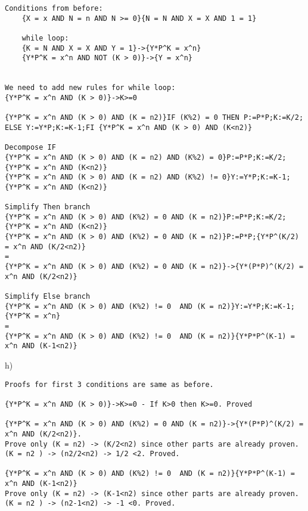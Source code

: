 \documentclass[a4paper]{article}
\begin{document}
\begin{lstlisting}	
Conditions from before:
	{X = x AND N = n AND N >= 0}{N = N AND X = X AND 1 = 1} 

	while loop:
	{K = N AND X = X AND Y = 1}->{Y*P^K = x^n} 
	{Y*P^K = x^n AND NOT (K > 0)}->{Y = x^n}
	
	
We need to add new rules for while loop:
{Y*P^K = x^n AND (K > 0)}->K>=0

{Y*P^K = x^n AND (K > 0) AND (K = n2)}IF (K%2) = 0 THEN P:=P*P;K:=K/2; ELSE Y:=Y*P;K:=K-1;FI {Y*P^K = x^n AND (K > 0) AND (K<n2)}

Decompose IF 
{Y*P^K = x^n AND (K > 0) AND (K = n2) AND (K%2) = 0}P:=P*P;K:=K/2;{Y*P^K = x^n AND (K<n2)}
{Y*P^K = x^n AND (K > 0) AND (K = n2) AND (K%2) != 0}Y:=Y*P;K:=K-1;{Y*P^K = x^n AND (K<n2)}

Simplify Then branch
{Y*P^K = x^n AND (K > 0) AND (K%2) = 0 AND (K = n2)}P:=P*P;K:=K/2;{Y*P^K = x^n AND (K<n2)}
{Y*P^K = x^n AND (K > 0) AND (K%2) = 0 AND (K = n2)}P:=P*P;{Y*P^(K/2) = x^n AND (K/2<n2)}
=
{Y*P^K = x^n AND (K > 0) AND (K%2) = 0 AND (K = n2)}->{Y*(P*P)^(K/2) = x^n AND (K/2<n2)}

Simplify Else branch
{Y*P^K = x^n AND (K > 0) AND (K%2) != 0  AND (K = n2)}Y:=Y*P;K:=K-1;{Y*P^K = x^n}
=
{Y*P^K = x^n AND (K > 0) AND (K%2) != 0  AND (K = n2)}{Y*P*P^(K-1) = x^n AND (K-1<n2)}
\end{lstlisting}

h)\\
\begin{lstlisting}	
Proofs for first 3 conditions are same as before. 

{Y*P^K = x^n AND (K > 0)}->K>=0 - If K>0 then K>=0. Proved

{Y*P^K = x^n AND (K > 0) AND (K%2) = 0 AND (K = n2)}->{Y*(P*P)^(K/2) = x^n AND (K/2<n2)}.
Prove only (K = n2) -> (K/2<n2) since other parts are already proven.
(K = n2 ) -> (n2/2<n2) -> 1/2 <2. Proved.

{Y*P^K = x^n AND (K > 0) AND (K%2) != 0  AND (K = n2)}{Y*P*P^(K-1) = x^n AND (K-1<n2)}
Prove only (K = n2) -> (K-1<n2) since other parts are already proven.
(K = n2 ) -> (n2-1<n2) -> -1 <0. Proved.


\end{lstlisting}
\end{document}
